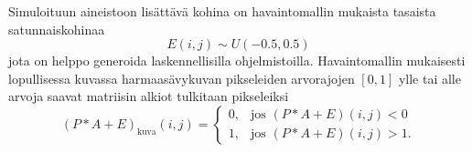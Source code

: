 Simuloituun aineistoon lisättävä kohina on havaintomallin mukaista tasaista satunnaiskohinaa
\begin{equation}
    E(i,j) \sim U(-0.5, 0.5)
\end{equation}
jota on helppo generoida laskennellisilla ohjelmistoilla.
Havaintomallin mukaisesti lopullisessa kuvassa harmaasävykuvan pikseleiden arvorajojen $[0, 1]$ ylle tai alle arvoja saavat matriisin alkiot tulkitaan pikseleiksi
\begin{equation}
    \label{eq:leikkaus}
    (P \ast A + E)_\text{kuva} (i,j) =
    \begin{cases}
        0 , &\text{jos } (P \ast A + E)(i,j) < 0\\
        1 , &\text{jos } (P \ast A + E)(i,j) > 1.
    \end{cases}
\end{equation}
